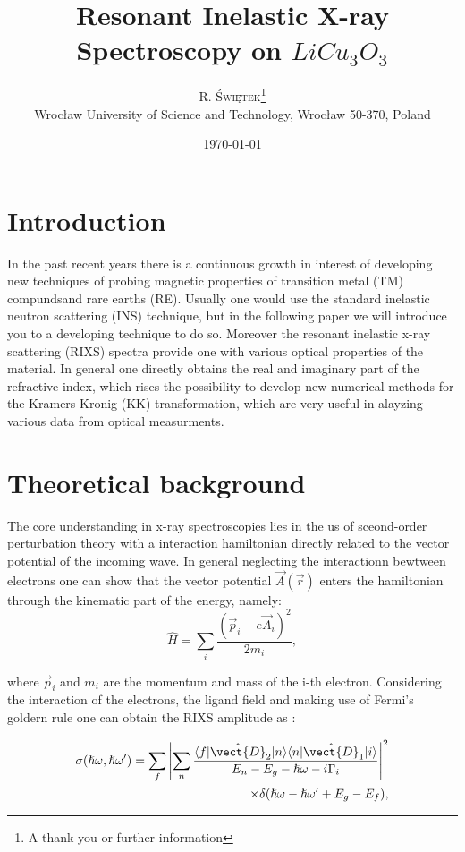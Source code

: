 \documentclass[twoside,twocolumn, elsart]{article}
\title{Resonant Inelastic X-ray Spectroscopy on $LiCu_3 O_3$ }
\author{%
\textsc{R. Świętek}\thanks{A thank you or further information} \\[1ex] 
\normalsize Wrocław University of Science and Technology, Wrocław 50-370, Poland \\ 
}
\date{\today} %
\begin{document}
\maketitle

\section{Introduction}
In the past recent years there is a continuous growth in interest of developing new techniques of probing magnetic properties of transition metal (TM) compundsand rare earths (RE). Usually one would use the standard inelastic neutron scattering (INS) technique, but in the following paper we will introduce you to a developing technique to do so. Moreover the resonant inelastic x-ray scattering (RIXS) spectra provide one with various optical properties of the material. In general one directly obtains the real and imaginary part of the refractive index, which rises the possibility to develop new numerical methods for the Kramers-Kronig (KK) transformation, which are very useful in alayzing various data from optical measurments.

\section{Theoretical background}

The core understanding in x-ray spectroscopies lies in the us of sceond-order perturbation theory with a interaction hamiltonian directly related to the vector potential of the incoming wave. In general neglecting the interactionn bewtween electrons one can show that the vector potential $\vec{A}(\vec{r})$ enters the hamiltonian through the kinematic part of the energy, namely:
\begin{equation}\label{eq: hamil}
\hat{H} = \sum_i\frac{(\vec{p}_i-e\vec{A}_i)^2}{2m_i},
\end{equation}

\noindent where $\vec{p}_i$ and $m_i$ are the momentum and mass of the i-th electron. Considering the interaction of the electrons, the ligand field and making use of Fermi's goldern rule one can obtain the RIXS amplitude as \cite{Schulke}:

\begin{equation}\label{eq: Kramer Heisenberg}
\begin{split}
\sigma(\hslash\omega,\hslash\omega')=\sum_f\left|\sum_n\frac{\langle f|\hat{\vect{D}}_2 |n\rangle \langle n|\hat{\vect{D}}_1|i\rangle}{E_n-E_g-\hslash\omega-i\Gamma_i}\right|^2\\
\times\delta(\hslash\omega-\hslash\omega'+E_g-E_f),
\end{split}
\end{equation}
\end{document}
